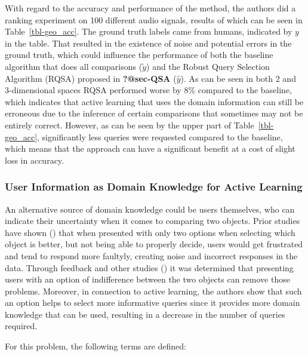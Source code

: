 \documentclass[
  letterpaper,
  numbers=noenddot,
  DIV=11]{scrreprt}
\theoremstyle{plain}
\theoremstyle{definition}
\theoremstyle{plain}
\theoremstyle{remark}
\begin{document}
With regard to the accuracy and performance of the method, the authors
did a ranking experiment on 100 different audio signals, results of
which can be seen in Table~\ref{tbl-geo_acc}. The ground truth labels
came from humans, indicated by \(y\) in the table. That resulted in the
existence of noise and potential errors in the ground truth, which could
influence the performance of both the baseline algorithm that does all
comparisons (\(\tilde{y}\)) and the Robust Query Selection Algorithm
(RQSA) proposed in \textbf{?@sec-QSA} (\(\hat{y}\)). As can be seen in
both 2 and 3-dimensional spaces RQSA performed worse by \(8\%\) compared
to the baseline, which indicates that active learning that uses the
domain information can still be erroneous due to the inference of
certain comparisons that sometimes may not be entirely correct. However,
as can be seen by the upper part of Table~\ref{tbl-geo_acc},
significantly less queries were requested compared to the baseline,
which means that the approach can have a significant benefit at a cost
of slight loss in accuracy.

\subsubsection*{User Information as Domain Knowledge for Active
Learning}\label{sec-geo_app}

An alternative source of domain knowledge could be users themselves, who
can indicate their uncertainty when it comes to comparing two objects.
Prior studies have shown () that when presented with only two options when selecting which
object is better, but not being able to properly decide, users would get
frustrated and tend to respond more faultyly, creating noise and
incorrect responses in the data. Through feedback and other studies
() it was
determined that presenting users with an option of indifference between
the two objects can remove those problems. Moreover, in connection to
active learning, the authors show that such an option helps to select
more informative queries since it provides more domain knowledge that
can be used, resulting in a decrease in the number of queries required.

For this problem, the following terms are defined:
\end{document}
